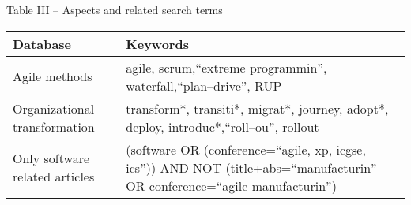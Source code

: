 \centering
Table III – Aspects and related search terms

\begin{tabular}{p{13em} p{30em}}
    \bfseries{Database} & \bfseries{Keywords} \\
    \hline
    Agile methods & agile, scrum,``extreme programmin'', waterfall,``plan–drive'', RUP \\
    Organizational transformation & transform*, transiti*, migrat*, journey, adopt*, deploy, introduc*,``roll–ou'', rollout \\
    Only software related articles & (software OR (conference=``agile, xp, icgse, ics'')) AND NOT (title+abs=``manufacturin'' OR conference=``agile manufacturin'') \\
    \hline
\end{tabular}

\justify
